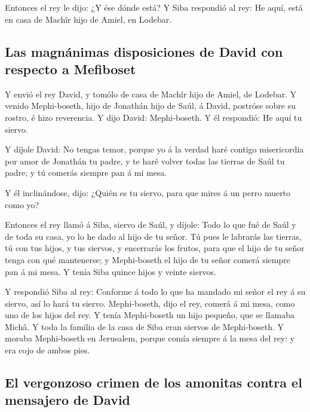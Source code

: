  Entonces el rey le dijo: ¿Y ése dónde está? Y Siba
respondió al rey: He aquí, está en casa de Machîr hijo de Amiel, en
Lodebar.

\hypertarget{las-magnuxe1nimas-disposiciones-de-david-con-respecto-a-mefiboset}{%
\subsection{Las magnánimas disposiciones de David con respecto a
Mefiboset}\label{las-magnuxe1nimas-disposiciones-de-david-con-respecto-a-mefiboset}}

 Y envió el rey David, y tomólo de casa de Machîr hijo de
Amiel, de Lodebar.  Y venido Mephi-boseth, hijo de Jonathán
hijo de Saúl, á David, postróse sobre su rostro, é hizo reverencia. Y
dijo David: Mephi-boseth. Y él respondió: He aquí tu siervo.

 Y díjole David: No tengas temor, porque yo á la verdad haré
contigo misericordia por amor de Jonathán tu padre, y te haré volver
todas las tierras de Saúl tu padre; y tú comerás siempre pan á mi mesa.

 Y él inclinándose, dijo: ¿Quién es tu siervo, para que
mires á un perro muerto como yo?

 Entonces el rey llamó á Siba, siervo de Saúl, y díjole:
Todo lo que fué de Saúl y de toda su casa, yo lo he dado al hijo de tu
señor.  Tú pues le labrarás las tierras, tú con tus hijos,
y tus siervos, y encerrarás los frutos, para que el hijo de tu señor
tenga con qué mantenerse; y Mephi-boseth el hijo de tu señor comerá
siempre pan á mi mesa. Y tenía Siba quince hijos y veinte siervos.

 Y respondió Siba al rey: Conforme á todo lo que ha mandado
mi señor el rey á su siervo, así lo hará tu siervo. Mephi-boseth, dijo
el rey, comerá á mi mesa, como uno de los hijos del rey.  Y
tenía Mephi-boseth un hijo pequeño, que se llamaba Michâ. Y toda la
familia de la casa de Siba eran siervos de Mephi-boseth.  Y
moraba Mephi-boseth en Jerusalem, porque comía siempre á la mesa del
rey: y era cojo de ambos pies.

\hypertarget{el-vergonzoso-crimen-de-los-amonitas-contra-el-mensajero-de-david}{%
\subsection{El vergonzoso crimen de los amonitas contra el mensajero de
David}\label{el-vergonzoso-crimen-de-los-amonitas-contra-el-mensajero-de-david}}

